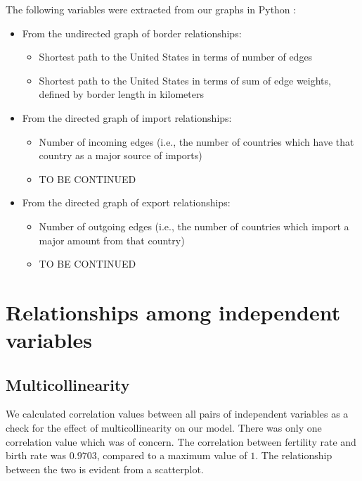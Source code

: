 \documentclass[oneside,12pt]{report}
\begin{document}
The following variables were extracted from our graphs in Python :
\begin{itemize}
\item From the undirected graph of border relationships:
	\begin{itemize}
	\item Shortest path to the United States in terms of number of edges
	\item Shortest path to the United States in terms of sum of edge weights, defined by border length in kilometers
	\end{itemize}
\item From the directed graph of import relationships:
	\begin{itemize}
	\item Number of incoming edges (i.e., the number of countries which have that country as a major source of imports)
	\item TO BE CONTINUED
	\end{itemize}
\item From the directed graph of export relationships:
	\begin{itemize}
	\item Number of outgoing edges (i.e., the number of countries which import a major amount from that country)
	\item TO BE CONTINUED
	\end{itemize}
\end{itemize}

\section*{Relationships among independent variables}
\subsection*{Multicollinearity}

We calculated correlation values between all pairs of independent variables as a check for the effect of multicollinearity on our model. There was only one correlation value which was of concern. The correlation between fertility rate and birth rate was \begin{math}0.9703\end{math}, compared to a maximum value of \begin{math}1\end{math}. The relationship between the two is evident from a scatterplot. 
\end{document}
